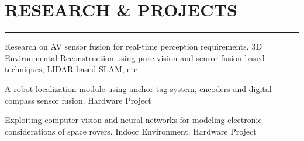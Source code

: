\documentclass[9pt]{ShumailaAhmed-Resume}
\begin{document}
\begin{minipage}[t]{0.66\textwidth}
\section{\hspace{240pt} \large  {RESEARCH \& PROJECTS}}
\noindent\rule{12.5cm}{0.2pt}

 
\descript{}
\noindent
\hspace{5em}%
\begin{minipage}{0.85\textwidth\vspace{1pt}}
\begin{justify}

{\small Research on AV sensor fusion for real-time perception requirements, 3D Environmental Reconstruction using pure vision and sensor fusion based techniques, LIDAR based SLAM, etc} 
\end{justify}
\end{minipage}

 
\descript{}
\noindent
\hspace{5em}%
\begin{minipage}{0.85\textwidth\vspace{1pt}}
{\small {}} 
\end{minipage}
 
\descript{}
\noindent
\hspace{5em}%
\begin{minipage}{0.85\textwidth\vspace{1pt}}
{\small A robot localization module using anchor tag system, encoders and digital compass
sensor fusion. Hardware Project}
\end{minipage}
 
\descript{}
\noindent
\hspace{5em}%
\begin{minipage}{0.85\textwidth\vspace{1pt}}
{\small Exploiting computer vision and neural networks for modeling electronic considerations
of space rovers.
Indoor Environment. Hardware Project}
\end{minipage}
\end{minipage} 
\end{document}
